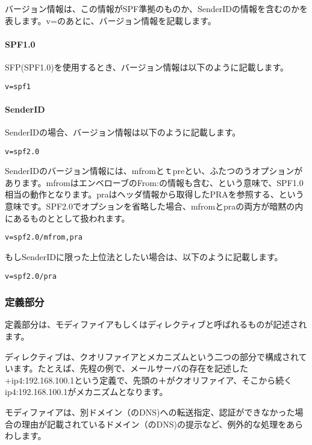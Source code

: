 バージョン情報は、この情報がSPF準拠のものか、SenderIDの情報を含むのかを表します。v=のあとに、バージョン情報を記載します。

\paragraph{SPF1.0}
SFP(SPF1.0)を使用するとき、バージョン情報は以下のように記載します。

\begin{verbatim}
v=spf1
\end{verbatim}

\paragraph{SenderID}
SenderIDの場合、バージョン情報は以下のように記載します。

\begin{verbatim}
v=spf2.0
\end{verbatim}

SenderIDのバージョン情報には、mfromとｔpreとい、ふたつのうオプションがあります。mfromはエンベローブのFrom:の情報も含む、という意味で、SPF1.0相当の動作となります。praはヘッダ情報から取得したPRAを参照する、という意味です。SPF2.0でオプションを省略した場合、mfromとpraの両方が暗黙の内にあるものととして扱われます。

\begin{verbatim}
v=spf2.0/mfrom,pra
\end{verbatim}

もしSenderIDに限った上位法としたい場合は、以下のように記載します。

\begin{verbatim}
v=spf2.0/pra
\end{verbatim}


\subsubsection{定義部分}

定義部分は、モディファイアもしくはディレクティブと呼ばれるものが記述されます。

ディレクティブは、クオリファイアとメカニズムという二つの部分で構成されています。たとえば、先程の例で、メールサーバの存在を記述した+ip4:192.168.100.1という定義で、先頭の＋がクオリファイア、そこから続くip4:192.168.100.1がメカニズムとなります。

モディファイアは、別ドメイン（のDNS)への転送指定、認証ができなかった場合の理由が記載されているドメイン（のDNS)の提示など、例外的な処理をあらわします。

